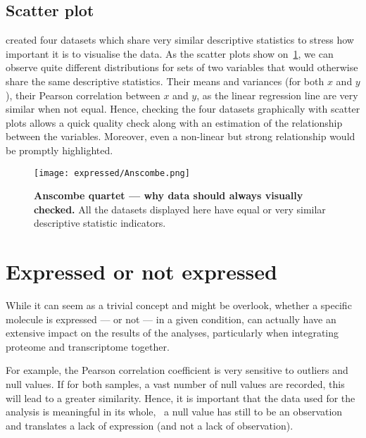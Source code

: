 \subsection{Scatter plot}

\cite{anscombe} created four datasets which share very similar descriptive
statistics to stress how important it is to visualise the data. As the scatter
plots show on~\cref{fig:Anscombe}, we can observe quite different distributions
for sets of two variables that would otherwise share the same descriptive
statistics. Their means and variances  (for both $x$ and $y$),
their Pearson correlation between $x$ and $y$, as
the linear regression line are very similar when not equal.
Hence, checking the four datasets graphically with scatter plots
allows a quick quality check along with an
estimation of the relationship between the variables. Moreover, even a non-linear
but strong relationship would be promptly highlighted.

\begin{figure}[!htbp]
    \texttt{[image: expressed/Anscombe.png]}\centering
      \caption[Anscombe quartet --- why data should always visualy checked]
      {\label{fig:Anscombe}\textbf{Anscombe quartet --- why data should always
      visually checked.}\smallbreak{} All the datasets displayed here have equal
      or very similar descriptive statistic indicators.}
\end{figure}

\section{Expressed or not expressed}
\label{sec:ExpressedOrNot}

While it can seem as a trivial concept and might be overlook, whether a specific
molecule is expressed --- or not --- in a given condition, can actually have
an extensive impact on the results of the analyses, particularly when integrating
proteome and transcriptome together.

For example, the Pearson correlation coefficient is very
sensitive to outliers and null values. If for both samples, a vast number of
null values are recorded, this will lead to a greater similarity.
Hence, it is important that the data used for the analysis is meaningful in
its whole, \ie\ a null value has still to be an observation and translates
a lack of expression (and not a lack of observation).

